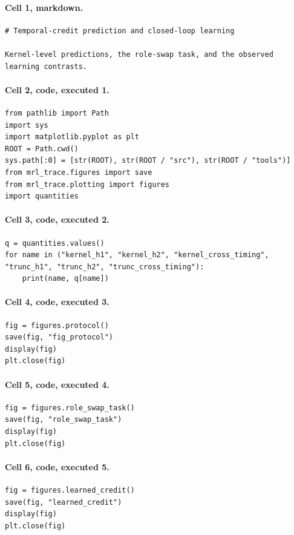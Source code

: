 \documentclass[a4paper,10pt]{article}
\begin{document}
\paragraph{Cell 1, markdown.}
\begin{Verbatim}
# Temporal-credit prediction and closed-loop learning

Kernel-level predictions, the role-swap task, and the observed learning contrasts.
\end{Verbatim}
\paragraph{Cell 2, code, executed 1.}
\begin{Verbatim}
from pathlib import Path
import sys
import matplotlib.pyplot as plt
ROOT = Path.cwd()
sys.path[:0] = [str(ROOT), str(ROOT / "src"), str(ROOT / "tools")]
from mrl_trace.figures import save
from mrl_trace.plotting import figures
import quantities
\end{Verbatim}
\paragraph{Cell 3, code, executed 2.}
\begin{Verbatim}
q = quantities.values()
for name in ("kernel_h1", "kernel_h2", "kernel_cross_timing", "trunc_h1", "trunc_h2", "trunc_cross_timing"):
    print(name, q[name])
\end{Verbatim}
\paragraph{Cell 4, code, executed 3.}
\begin{Verbatim}
fig = figures.protocol()
save(fig, "fig_protocol")
display(fig)
plt.close(fig)
\end{Verbatim}
\paragraph{Cell 5, code, executed 4.}
\begin{Verbatim}
fig = figures.role_swap_task()
save(fig, "role_swap_task")
display(fig)
plt.close(fig)
\end{Verbatim}
\paragraph{Cell 6, code, executed 5.}
\begin{Verbatim}
fig = figures.learned_credit()
save(fig, "learned_credit")
display(fig)
plt.close(fig)
\end{Verbatim}
\end{document}

